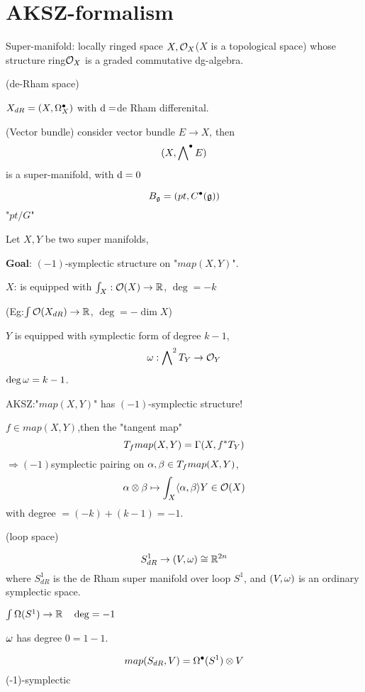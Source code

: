 \section{AKSZ-formalism}

Super-manifold: locally ringed space $X,\mathcal{O}_X$($X$ is a topological space) 
whose structure ring$\mathcal{O}_X$ is a graded commutative dg-algebra.

\begin{example}(de-Rham space)

$X_{dR}=(X,\Omega_X^{\bullet})$ with $\mathrm{d}=$de Rham differenital.
\end{example}

\begin{example}(Vector bundle)
consider vector bundle $E\to X$, then 
$$(X,\bigwedge\nolimits^{\bullet}E)$$
is a super-manifold, with $\mathrm{d}=0$
\end{example}

\begin{example}

$$B_{\mathfrak{g}}=(pt,C^{\bullet}(\mathfrak{g}))$$
"$pt/G$"
\end{example}

Let $X,Y$ be two super manifolds, 

\textbf{Goal}: $(-1)$-symplectic structure on "$map(X,Y)$".

$X$: is equipped with $\int_X:\mathcal{O}(X)\to\mathbb{R}$,
$\deg=-k$

(Eg:$\int\mathcal{O}(X_{dR})\to\mathbb{R}$, $\deg=-\dim X$)

$Y$ is equipped with symplectic form of degree $k-1$, 
$$\omega:\bigwedge\nolimits^{2}T_Y\to\mathcal{O}_Y$$
$\deg\omega=k-1$.

AKSZ:"$map(X,Y)$" has $(-1)$-symplectic structure!

$f\in map(X,Y)$,then the "tangent map"
$$T_f map(X,Y)=\Gamma(X,f^*T_Y)$$
$\Rightarrow(-1)$symplectic pairing on 
$\alpha,\beta\in T_fmap(X,Y)$,
$$\alpha\otimes\beta\mapsto\int_X\langle\alpha,\beta\rangle Y\in\mathcal{O}(X)$$
with degree $=(-k)+(k-1)=-1$.

\begin{example}(loop space)

$$S^1_{dR}\to (V,\omega)\cong \mathbb{R}^{2n}$$
where $S^1_{dR}$ is the de Rham super manifold over loop $S^1$, 
and $(V,\omega)$ is an ordinary symplectic space.

$\int\Omega(S^1)\to\mathbb{R}\quad\deg=-1$

$\omega$ has degree $0=1-1$.

$$map(S_{dR},V)=\Omega^{\bullet}(S^1)\otimes V$$
(-1)-symplectic
\end{example}


